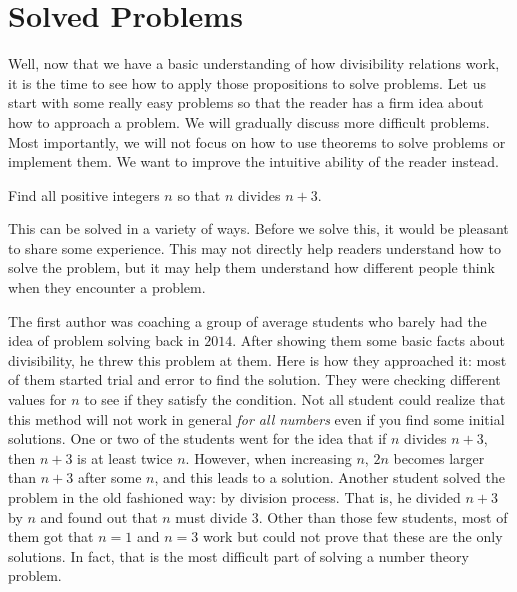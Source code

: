 \section{Solved Problems}
Well, now that we have a basic understanding of how divisibility relations work, it is the time to see how to apply those propositions to solve problems. Let us start with some really easy problems so that the reader has a firm idea about how to approach a problem. We will gradually discuss more difficult problems. Most importantly, we will not focus on how to use theorems to solve problems or implement them. We want to improve the intuitive ability of the reader instead.
	\begin{problem}
		Find all positive integers $n$ so that $n$ divides $n+3$.
	\end{problem}
This can be solved in a variety of ways. Before we solve this, it would be pleasant to share some experience. This may not directly help readers understand how to solve the problem, but it may help them understand how different people think when they encounter a problem.

The first author was coaching a group of average students who barely had the idea of problem solving back in $2014$. After showing them some basic facts about divisibility, he threw this problem at them. Here is how they approached it: most of them started trial and error to find the solution. They were checking different values for $n$ to see if they satisfy the condition. Not all student could realize that this method will not work in general \textit{for all numbers} even if you find some initial solutions. One or two of the students went for the idea that if $n$ divides $n+3$, then $n+3$ is at least twice $n$. However, when increasing $n$, $2n$ becomes larger than $n+3$ after some $n$, and this leads to a solution. Another student solved the problem in the old fashioned way: by division process. That is, he divided $n+3$ by $n$ and found out that $n$ must divide $3$. Other than those few students, most of them got that $n=1$ and $n=3$ work but could not prove that these are the only solutions. In fact, that is the most difficult part of solving a number theory problem.

